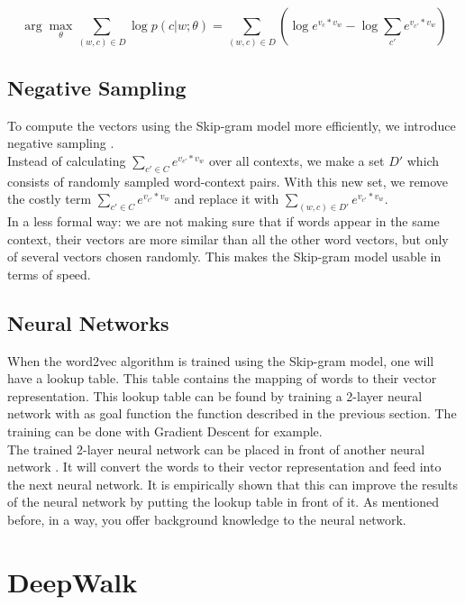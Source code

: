 \begin{equation} 
\arg \max_{\theta} \sum_{(w,c) \in D} \log p(c|w;\theta) = \sum_{(w,c) \in D} (\log e^{v_c * v_w} - \log \sum_{c'} e^{v_{c'}*v_w})
\end{equation}

\subsection{Negative Sampling}

To compute the vectors using the Skip-gram model more efficiently, we introduce negative sampling \cite{w2vExplained:article}. \\
Instead of calculating $\sum_{c' \in C}e^{v_{c'}*v_w}$ over all contexts, we make a set $D'$ which consists of randomly sampled word-context pairs. With this new set, we remove the costly term $\sum_{c' \in C}e^{v_{c'}*v_w}$ and replace it with $\sum_{(w,c) \in D'}e^{v_{c'}*v_w}$. \\

In a less formal way: we are not making sure that if words appear in the same context, their vectors are more similar than all the other word vectors, but only of several vectors chosen randomly. This makes the Skip-gram model usable in terms of speed.


\subsection{Neural Networks}

When the word2vec algorithm is trained using the Skip-gram model, one will have a lookup table. This table contains the mapping of words to their vector representation. This lookup table can be found by training a 2-layer neural network with as goal function the function described in the previous section. The training can be done with Gradient Descent for example. \\
The trained 2-layer neural network can be placed in front of another neural network \cite{w2vNN:online}. It will convert the words to their vector representation and feed into the next neural network. It is empirically shown that this can improve the results of the neural network by putting the lookup table in front of it. As mentioned before, in a way, you offer background knowledge to the neural network.

\newpage
\section{DeepWalk}

